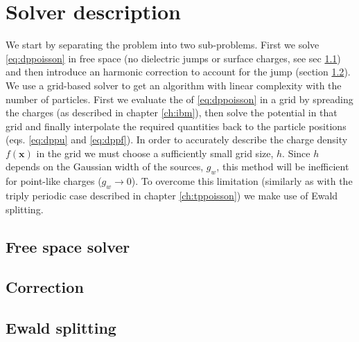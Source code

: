 \documentclass[ twoside,openright,titlepage,numbers=noenddot,%
headinclude,footinclude,cleardoublepage=empty,abstract=on,
BCOR=5mm,paper=a4,fontsize=11pt, dvipsnames
]{scrreprt}
\renewcommand{\vec}[1]{\bm{#1}}
\begin{document}
\section{Solver description}
We start by separating the problem into two sub-problems. First we solve \eqref{eq:dppoisson} in free space (no dielectric jumps or surface charges, see sec \ref{sec:dpsolver}) and then introduce an harmonic correction to account for the jump \bcs (section \ref{sec:dpcorr}).
We use a grid-based solver to get an algorithm with linear complexity with the number of particles. First we evaluate the \rhs of \eqref{eq:dppoisson} in a grid by spreading the charges (as described in chapter \ref{ch:ibm}), then solve the potential in that grid and finally interpolate the required quantities back to the particle positions (eqs. \eqref{eq:dppu} and \eqref{eq:dppf}).
In order to accurately describe the charge density $f(\vec{x})$ in the grid we must choose a sufficiently small grid size, $h$. Since $h$ depends on the Gaussian width of the sources, $g_w$, this method will be inefficient for point-like charges ($g_w\rightarrow 0$). To overcome this limitation (similarly as with the triply periodic case described in chapter \ref{ch:tppoisson}) we make use of Ewald splitting.

\subsection{Free space solver}\label{sec:dpsolver}


\subsection{Correction}\label{sec:dpcorr}

\subsection{Ewald splitting}\label{sec:dpewald}
\end{document}
